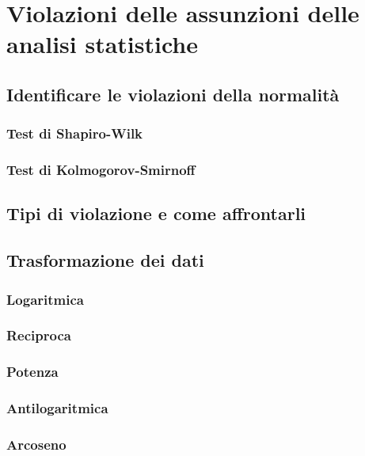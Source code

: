 \documentclass[10pt, draft]{book}
\begin{document}
\chapter{Violazioni delle assunzioni delle analisi statistiche}

\section{Identificare le violazioni della normalità}

\subsection{Test di Shapiro-Wilk}

\subsection{Test di Kolmogorov-Smirnoff}

\section{Tipi di violazione e come affrontarli}

\section{Trasformazione dei dati}

\subsection{Logaritmica}

\subsection{Reciproca}

\subsection{Potenza}

\subsection{Antilogaritmica}

\subsection{Arcoseno}
\end{document}
